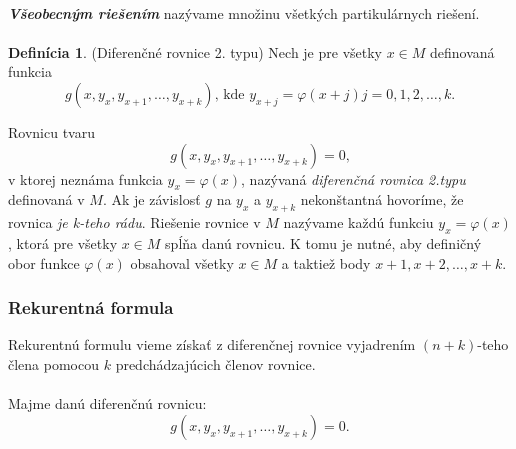\documentclass[a4paper,10pt]{article}
\theoremstyle{plain}
\theoremstyle{definition}
\newtheorem{defin}[thm]{Definícia}
\begin{document}
\paragraph{}
\textbf{\textit{Všeobecným riešením}} nazývame množinu všetkých partikulárnych
riešení.

\paragraph{}
\begin{defin}
(Diferenčné rovnice 2. typu)
Nech je pre všetky $x \in M$
definovaná funkcia
$$g(x, y_{x}, y_{x+1}, \ldots, y_{x+k})\text{, kde }y_{x+j} = \varphi(x + j) j = 0, 1, 2, \ldots, k\text{.}$$
\end{defin}

Rovnicu tvaru
$$g(x, y_{x}, y_{x+1}, \ldots, y_{x+k}) = 0\text{,}$$
v ktorej neznáma funkcia $y_{x} = \varphi(x)$, nazývaná \textit{diferenčná rovnica 2.typu}
definovaná v $M$. Ak je závislosť $g$ na $y_{x}$ a $y_{x+k}$ nekonštantná hovoríme,
že rovnica \textit{je k-teho rádu}. Riešenie rovnice v $M$ nazývame každú funkciu
$y_{x} = \varphi(x)$, ktorá pre všetky $x \in M$  spĺňa danú rovnicu. K tomu je nutné,
aby definičný obor funkce $\varphi(x)$ obsahoval všetky $x \in M$ a taktiež body
$x + 1, x + 2, \ldots, x + k$.
\newpage
\subsubsection{Rekurentná formula}
Rekurentnú formulu vieme získať z diferenčnej rovnice vyjadrením $(n+k)$-teho člena pomocou $k$ predchádzajúcich členov rovnice.

\paragraph{}
Majme danú diferenčnú rovnicu: $$g(x, y_{x}, y_{x+1}, \ldots, y_{x+k}) = 0\text{.}$$
\end{document}
